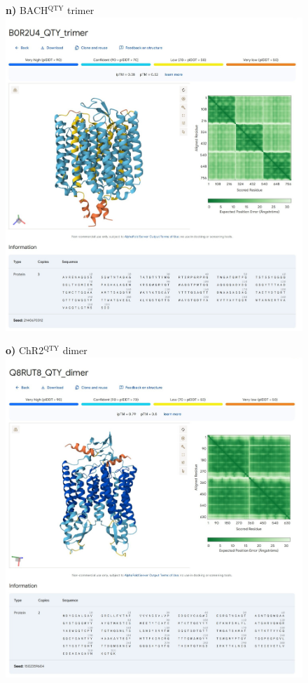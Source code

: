 \documentclass[fleqn,12pt]{supp}
\begin{document}
\newpage
\begin{figure}[H]
    \textbf{n)} BACH$^{\textrm{QTY}}$ trimer \\
    \includegraphics[width=\linewidth]{FigureS2n.jpg}
\end{figure}

\newpage
\begin{figure}[H]
    \textbf{o)} ChR2$^{\textrm{QTY}}$ dimer \\
    \includegraphics[width=\linewidth]{FigureS2o.jpg}
\end{figure}
\end{document}
